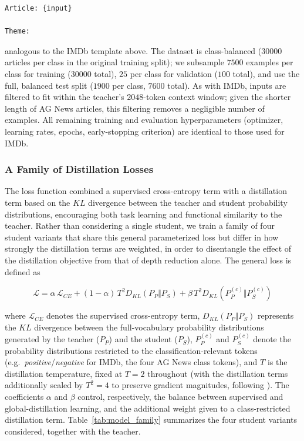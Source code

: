 \documentclass[conference]{IEEEtran}
\begin{document}
\begin{lstlisting}
Article: {input}

Theme:
\end{lstlisting}

analogous to the IMDb template above. The dataset is class-balanced ($30000$ articles per class in the original training split); we subsample $7500$ examples per class for training ($30000$ total), $25$ per class for validation ($100$ total), and use the full, balanced test split ($1900$ per class, $7600$ total). As with IMDb, inputs are filtered to fit within the teacher's $2048$-token context window; given the shorter length of AG News articles, this filtering removes a negligible number of examples. All remaining training and evaluation hyperparameters (optimizer, learning rates, epochs, early-stopping criterion) are identical to those used for IMDb.

\subsubsection{A Family of Distillation Losses}\label{sec:loss}

The loss function combined a supervised cross-entropy term with a distillation term based on the $KL$ divergence between the teacher and student probability distributions, encouraging both task learning and functional similarity to the teacher. Rather than considering a single student, we train a family of four student variants that share this general parameterized loss but differ in how strongly the distillation terms are weighted, in order to disentangle the effect of the distillation objective from that of depth reduction alone. The general loss is defined as

\[
\mathcal{L}
=
\alpha\,\mathcal{L}_{CE}
+
(1-\alpha)\,T^2 D_{KL}(P_P \Vert P_S)
+
\beta\,T^2 D_{KL}(P_P^{(c)} \Vert P_S^{(c)})
\]

where $\mathcal{L}_{CE}$ denotes the supervised cross-entropy term, $D_{KL}(P_P \Vert P_S)$ represents the $KL$ divergence between the full-vocabulary probability distributions generated by the teacher ($P_P$) and the student ($P_S$), $P_P^{(c)}$ and $P_S^{(c)}$ denote the probability distributions restricted to the classification-relevant tokens (e.g.\ \textit{positive}/\textit{negative} for IMDb, the four AG News class tokens), and $T$ is the distillation temperature, fixed at $T=2$ throughout (with the distillation terms additionally scaled by $T^2=4$ to preserve gradient magnitudes, following \cite{hinton2015distilling}). The coefficients $\alpha$ and $\beta$ control, respectively, the balance between supervised and global-distillation learning, and the additional weight given to a class-restricted distillation term. Table~\ref{tab:model_family} summarizes the four student variants considered, together with the teacher.
\end{document}
